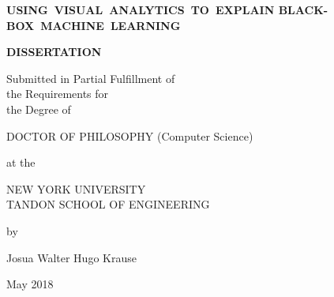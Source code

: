 \documentclass[12pt,letterpaper]{report}
\newcommand{\thesistitle}{USING~VISUAL~ANALYTICS~TO~EXPLAIN
BLACK-BOX~MACHINE~LEARNING}
\newcommand{\thesisauthor}{Josua Walter Hugo Krause}
\newcommand{\graddate}{May 2018} %
\begin{document}

\thispagestyle{empty}
\begin{center}
{\bfseries 
  {\large\thesistitle}
  \vspace{1in}
  
 {\large {\bf DISSERTATION}}\\
  \vspace{.5in}
  
  \begin{doublespace}
  {\large  
  Submitted in Partial Fulfillment of\\
  the Requirements for\\
  the Degree of\\}
  \end{doublespace}
  \vspace{.5in}
  
  {\large DOCTOR OF PHILOSOPHY (Computer Science)}\\
  \vspace{.5in}
  
  at the \\
  \vspace{.2in}
  
  {\large
  NEW YORK UNIVERSITY\\
  \vspace{-0.05in}
  TANDON SCHOOL OF ENGINEERING\\
  }
  \vspace{.2in}
  
  by
  \vspace{.5in}

  {\large\thesisauthor}
  \vspace{.5in}

  {\large\graddate}
}

\end{center}

\newpage
\end{document}
